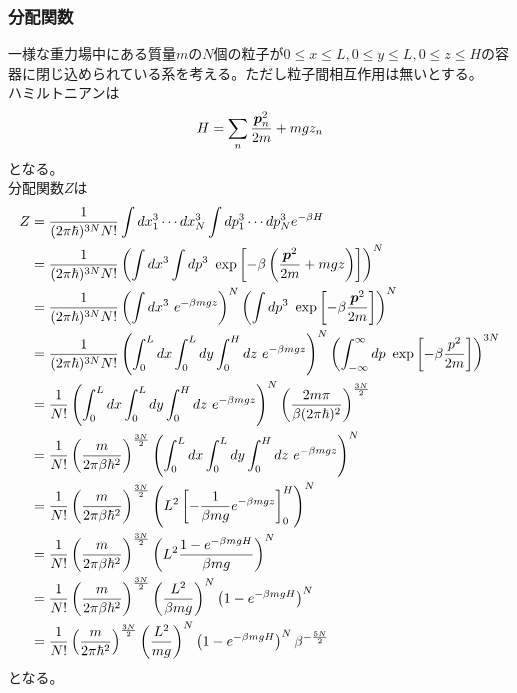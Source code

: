 \documentclass{jsarticle}  %
\numberwithin{equation}{section} %
\numberwithin{figure}{section}
\begin{document}
\subsubsection{分配関数}
    一様な重力場中にある質量$m$の$N$個の粒子が$0 \le x \le L, 0 \le y \le L, 0 \le z \le H $の容器に閉じ込められている系を考える。ただし粒子間相互作用は無いとする。\\
    ハミルトニアンは
    \begin{align}
        H = \sum_n \frac{\bm{p}_n^2}{2m} + mgz_n \notag
    \end{align}
    となる。\\
    分配関数$Z$は
    \begin{align}
        Z &= \frac{1}{(2\pi \hbar)^{3N} N!} \int dx^3_1 \cdots dx^3_N \int dp^3_1 \cdots d p^3_N e^{-\beta H} \notag \\
        &= \frac{1}{(2\pi \hbar)^{3N} N!} \left( \int dx^3 \int dp^3\ \exp\left[ -\beta \left( \frac{\bm{p}^2}{2m} + mgz \right) \right] \right)^N \notag \\
        &= \frac{1}{(2\pi \hbar)^{3N} N!} \left( \int dx^3\ e^{ -\beta  mgz } \right)^N \left( \int dp^3\ \exp\left[ -\beta \frac{\bm{p}^2}{2m} \right] \right)^N \notag \\ 
        &= \frac{1}{(2\pi \hbar)^{3N} N!} \left( \int_0^L dx \int_0^L dy\int_0^H dz\ e^{ -\beta  mgz } \right)^N \left( \int_{-\infty}^\infty dp\ \exp\left[ -\beta \frac{p^2}{2m} \right] \right)^{3N} \notag \\
        &= \frac{1}{N!} \left( \int_0^L dx \int_0^L dy\int_0^H dz\ e^{ -\beta  mgz } \right)^N \left( \frac{2m\pi}{\beta (2\pi \hbar)^{2}} \right)^{\frac{3N}{2}} \notag \\
        &= \frac{1}{N!} \left( \frac{m}{ 2\pi \beta \hbar^2} \right)^{\frac{3N}{2}} \left( \int_0^L dx \int_0^L dy\int_0^H dz\ e^{ -\beta  mgz } \right)^N  \notag \\
        &= \frac{1}{N!} \left( \frac{m}{ 2\pi \beta \hbar^2} \right)^{\frac{3N}{2}} \left( L^2\left[ -\frac{1}{\beta mg} e^{ -\beta  mgz } \right]_0^H\right)^N  \notag \\
        &= \frac{1}{N!} \left( \frac{m}{ 2\pi \beta \hbar^2} \right)^{\frac{3N}{2}} \left(L^2 \frac{1 - e^{ -\beta  mgH } }{\beta mg} \right)^N  \notag \\
        &= \frac{1}{N!} \left( \frac{m}{ 2\pi \beta \hbar^2} \right)^{\frac{3N}{2}} \left( 
        \frac{L^2}{\beta mg} \right)^N \left(1 - e^{ -\beta  mgH} \right)^N  \notag \\
        &= \frac{1}{N!} \left( \frac{m}{ 2\pi \hbar^2} \right)^{\frac{3N}{2}} \left( 
        \frac{L^2}{mg} \right)^N \left(1 - e^{ -\beta  mgH} \right)^N \beta^{-\frac{5N}{2}} 
    \end{align}
    となる。
\end{document}
